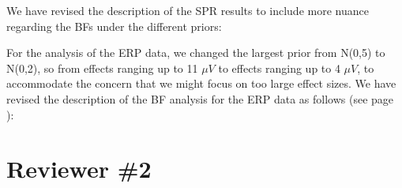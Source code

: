 \documentclass[12pt]{article}
\begin{document}
We have revised the description of the SPR results to include more nuance regarding the BFs under the different priors:

\setcounter{figure}{4}

For the analysis of the ERP data, we changed the largest prior from N(0,5) to N(0,2), so from effects ranging up to 11 $\mu V$ to effects ranging up to 4 $\mu V$, to accommodate the concern that we might focus on too large effect sizes. We have revised the description of the BF analysis for the ERP data as follows (see page \pageref{ERP_results3}):



\section*{Reviewer \#2} 
\end{document}
